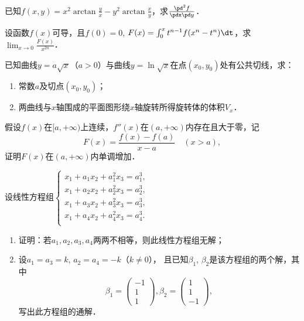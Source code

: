 \documentclass[plain,noanswer,medmath]{../../template/jnuexam}
\begin{document}

\begin{problem}
已知$f(x,y) = x^2\arctan \frac{y}{x} - y^2\arctan \frac{x}{y}$，求$\frac{\pd^2 f}{\pdx\pd y}$．
\end{problem}



\begin{problem}
设函数$f(x)$可导，且$f(0) = 0$, $F(x) = \int_0^x t^{n - 1} f(x^n - t^n)\dt$，求$\lim_{x \to 0} \frac{F(x)}{x^{2n}}$．
\end{problem}



\begin{problem}
已知曲线$y = a\sqrt{x}$（$a > 0$）与曲线$y = \ln \sqrt{x}$在点$(x_0,y_0)$处有公共切线，求：
\begin{enumerate}
\item 常数$a$及切点$(x_0,y_0)$；
\item 两曲线与$x$轴围成的平面图形绕$x$轴旋转所得旋转体的体积$V_x$．
\end{enumerate}
\end{problem}



\begin{problem}
假设$f(x)$在$[a, +\infty)$上连续，$f''(x)$在$\left(a, +\infty \right)$内存在且大于零，记
$$F(x) = \frac{f(x) - f(a)}{x - a}\quad (x > a),$$
证明$F(x)$在$\left(a, +\infty \right)$内单调增加．
\end{problem}



\begin{problem}
设线性方程组$\begin{cases}
 x_1 + a_1x_2 + a_1^2x_3 = a_1^3, \\
 x_1 + a_2x_2 + a_2^2x_3 = a_2^3, \\
 x_1 + a_3x_2 + a_3^2x_3 = a_3^3, \\
 x_1 + a_4x_2 + a_4^2x_3 = a_4^3. \\
\end{cases}$
\begin{enumerate}
\item 证明：若$a_1,a_2,a_3,a_4$两两不相等，则此线性方程组无解；
\item 设$a_1 = a_3 = k$, $a_2 = a_4 = - k$（$k \ne 0$），
      且已知$\beta_1$, $\beta_2$是该方程组的两个解，其中
$$\beta_1 = \begin{pmatrix}
  -1 \\
  1 \\
  1
\end{pmatrix},\beta_2 = \begin{pmatrix}
  1 \\
  1 \\
  -1
\end{pmatrix},$$
写出此方程组的通解．
\end{enumerate}
\end{problem}
\end{document}
